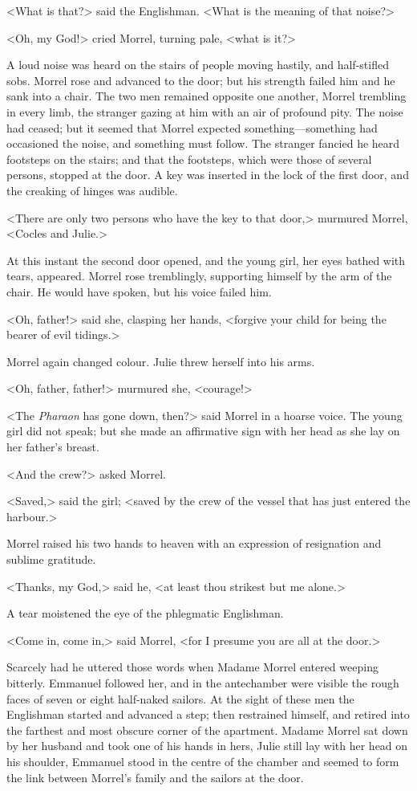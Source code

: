  <What is that?> said the Englishman. <What is the meaning of that noise?> 

 <Oh, my God!> cried Morrel, turning pale, <what is it?> 

 A loud noise was heard on the stairs of people moving hastily, and half-stifled sobs. Morrel rose and advanced to the door; but his strength failed him and he sank into a chair. The two men remained opposite one another, Morrel trembling in every limb, the stranger gazing at him with an air of profound pity. The noise had ceased; but it seemed that Morrel expected something—something had occasioned the noise, and something must follow. The stranger fancied he heard footsteps on the stairs; and that the footsteps, which were those of several persons, stopped at the door. A key was inserted in the lock of the first door, and the creaking of hinges was audible. 

 <There are only two persons who have the key to that door,> murmured Morrel, <Cocles and Julie.> 

 At this instant the second door opened, and the young girl, her eyes bathed with tears, appeared. Morrel rose tremblingly, supporting himself by the arm of the chair. He would have spoken, but his voice failed him. 

 <Oh, father!> said she, clasping her hands, <forgive your child for being the bearer of evil tidings.> 

 Morrel again changed colour. Julie threw herself into his arms. 

 <Oh, father, father!> murmured she, <courage!> 

 <The \textit{Pharaon} has gone down, then?> said Morrel in a hoarse voice. The young girl did not speak; but she made an affirmative sign with her head as she lay on her father's breast. 

 <And the crew?> asked Morrel. 

 <Saved,> said the girl; <saved by the crew of the vessel that has just entered the harbour.> 

 Morrel raised his two hands to heaven with an expression of resignation and sublime gratitude. 

 <Thanks, my God,> said he, <at least thou strikest but me alone.> 

 A tear moistened the eye of the phlegmatic Englishman. 

 <Come in, come in,> said Morrel, <for I presume you are all at the door.> 

 Scarcely had he uttered those words when Madame Morrel entered weeping bitterly. Emmanuel followed her, and in the antechamber were visible the rough faces of seven or eight half-naked sailors. At the sight of these men the Englishman started and advanced a step; then restrained himself, and retired into the farthest and most obscure corner of the apartment. Madame Morrel sat down by her husband and took one of his hands in hers, Julie still lay with her head on his shoulder, Emmanuel stood in the centre of the chamber and seemed to form the link between Morrel's family and the sailors at the door. 

